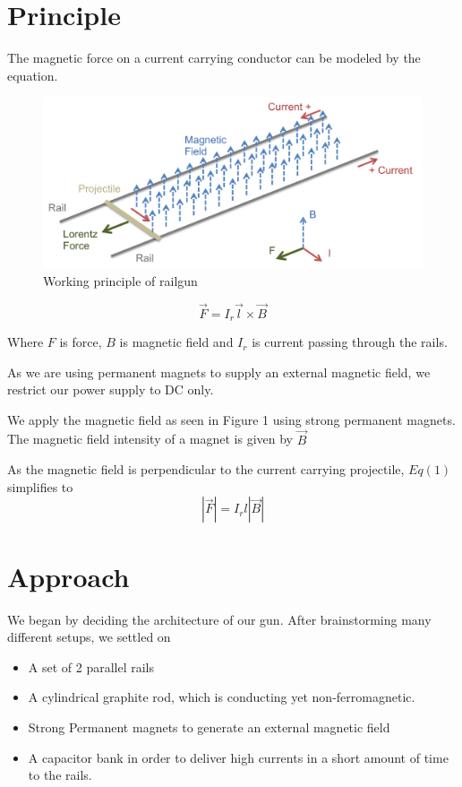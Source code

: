 \documentclass[twocolumn]{article}
\begin{document}
\section{Principle}

The magnetic force on a current carrying conductor can be modeled by the equation. 
	
\begin{figure}[htp]
	\caption{Working principle of railgun}
	\includegraphics[width=\linewidth]{railgun_physics.png}
\end{figure}
	
\begin{equation}
\vec{F}=I_{r} \vec{l} \times \vec{B}
\end{equation}

Where $F$ is force, $B$ is magnetic field and $I_{r}$ is current passing through the rails.

As we are using permanent magnets to supply an external magnetic field, we restrict our power supply to DC only.
 
	We apply the magnetic field as seen in Figure 1 using strong permanent magnets. The magnetic field intensity of a magnet is given by $\vec{B}$
	

As the magnetic field is perpendicular to the current carrying projectile, $Eq(1)$ simplifies to
 \[|\vec{F}|=I_{r} l|\vec{B}|\]



 

\section{Approach}
We began by deciding the architecture of our gun.
After brainstorming many different setups, we settled on 

\begin{itemize}
\item A set of 2 parallel rails
\item A cylindrical graphite rod, which is conducting yet non-ferromagnetic.
\item Strong Permanent magnets to generate an external magnetic field
\item A capacitor bank in order to deliver high currents in a short amount of time to the rails.
\end{itemize}
\end{document}

